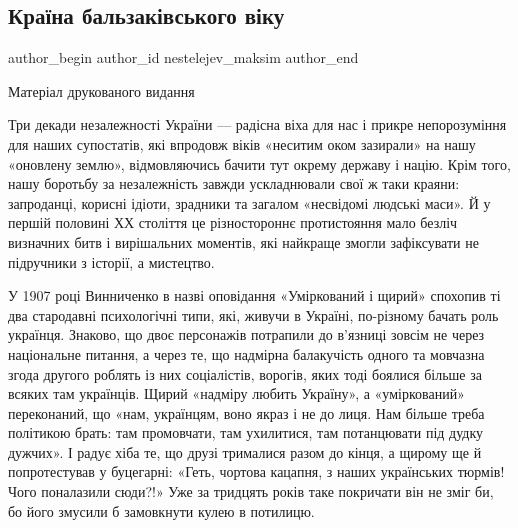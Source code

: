  
 
 
 
 
\subsection{Країна бальзаківського віку}
\label{sec:11_09_2021.stz.news.ua.tyzhden.1.kraina_balzak_vozrast}


\ifcmt
 author_begin
   author_id nestelejev_maksim
 author_end
\fi

Матеріал друкованого видання 


Три декади незалежності України — радісна віха для нас і прикре непорозуміння
для наших супостатів, які впродовж віків «неситим оком зазирали» на нашу
«оновлену землю», відмовляючись бачити тут окрему державу і націю. Крім того,
нашу боротьбу за незалежність завжди ускладнювали свої ж таки краяни:
запроданці, корисні ідіоти, зрадники та загалом «несвідомі людські маси». Й у
першій половині ХХ століття це різностороннє протистояння мало безліч визначних
битв і вирішальних моментів, які найкраще змогли зафіксувати не підручники з
історії, а мистецтво.

У 1907 році Винниченко в назві оповідання «Уміркований і щирий» спохопив ті два
стародавні психологічні типи, які, живучи в Україні, по-різному бачать роль
українця. Знаково, що двоє персонажів потрапили до в’язниці зовсім не через
національне питання, а через те, що надмірна балакучість одного та мовчазна
згода другого роблять із них соціалістів, ворогів, яких тоді боялися більше за
всяких там українців. Щирий «надміру любить Україну», а «уміркований»
переконаний, що «нам, українцям, воно якраз і не до лиця. Нам більше треба
політикою брать: там промовчати, там ухилитися, там потанцювати під дудку
дужчих». І радує хіба те, що друзі трималися разом до кінця, а щирому ще й
попротестував у буцегарні: «Геть, чортова кацапня, з наших українських тюрмів!
Чого поналазили сюди?!» Уже за тридцять років таке покричати він не зміг би, бо
його змусили б замовкнути кулею в потилицю.
